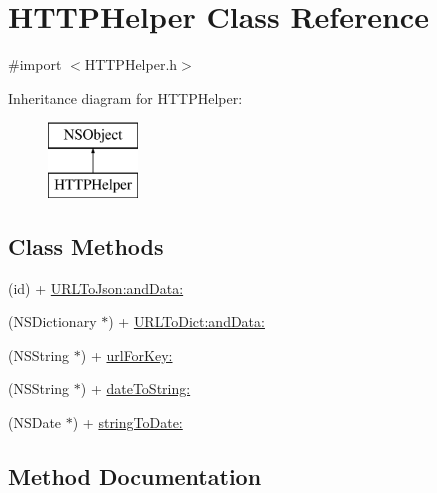 \hypertarget{interface_h_t_t_p_helper}{}\section{H\+T\+T\+P\+Helper Class Reference}
\label{interface_h_t_t_p_helper}


{\ttfamily \#import $<$H\+T\+T\+P\+Helper.\+h$>$}

Inheritance diagram for H\+T\+T\+P\+Helper\+:\begin{figure}[H]
\begin{center}
\leavevmode
\includegraphics[height=2.000000cm]{interface_h_t_t_p_helper}
\end{center}
\end{figure}
\subsection*{Class Methods}
\begin{DoxyCompactItemize}
\item 
(id) + \hyperlink{interface_h_t_t_p_helper_aa562571f57262ed6c99a33a31d98e0b9}{U\+R\+L\+To\+Json\+:and\+Data\+:}
\item 
(N\+S\+Dictionary $\ast$) + \hyperlink{interface_h_t_t_p_helper_a36e96541179c1bd3bb61e80a1f84b65d}{U\+R\+L\+To\+Dict\+:and\+Data\+:}
\item 
(N\+S\+String $\ast$) + \hyperlink{interface_h_t_t_p_helper_a6fef953a89c7d1d1965fe6283bc33981}{url\+For\+Key\+:}
\item 
(N\+S\+String $\ast$) + \hyperlink{interface_h_t_t_p_helper_a4cf3a9bb5325fca6dbe188b00f8e82e9}{date\+To\+String\+:}
\item 
(N\+S\+Date $\ast$) + \hyperlink{interface_h_t_t_p_helper_ab3b34ad0828d8387569f7f484a7f7ba8}{string\+To\+Date\+:}
\end{DoxyCompactItemize}


\subsection{Method Documentation}
\hypertarget{interface_h_t_t_p_helper_a4cf3a9bb5325fca6dbe188b00f8e82e9}{}\label{interface_h_t_t_p_helper_a4cf3a9bb5325fca6dbe188b00f8e82e9} 
